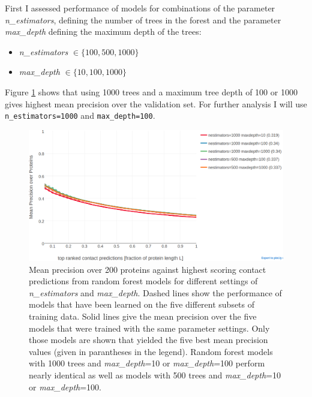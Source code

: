 \documentclass[12pt,a4paper,twoside]{book}
\providecommand{\tightlist}{%
  \setlength{\itemsep}{0pt}\setlength{\parskip}{0pt}}
\theoremstyle{definition}
\theoremstyle{definition}
\theoremstyle{remark}
\begin{document}
First I assessed performance of models for combinations of the parameter
\emph{n\_estimators}, defining the number of trees in the forest and the
parameter \emph{max\_depth} defining the maximum depth of the trees:

\begin{itemize}
\tightlist
\item
  \emph{n\_estimators} \(\in \{100,500,1000\}\)
\item
  \emph{max\_depth} \(\in \{10, 100, 1000\}\)
\end{itemize}

Figure \ref{fig:rf-gridsearch-nestimators-maxfeatures} shows that using
1000 trees and a maximum tree depth of 100 or 1000 gives highest mean
precision over the validation set. For further analysis I will use
\texttt{n\_estimators=1000} and \texttt{max\_depth=100}.













\begin{figure}

{\centering \includegraphics[width=0.9\linewidth]{img/random_forest_contact_prior/new_gridsearch/precision_vs_rank_cv_on_test_random_forest_nestimators1000_maxdepth1000_top5_notitle} 

}

\caption{Mean precision over
200 proteins against highest scoring contact predictions from random
forest models for different settings of \emph{n\_estimators} and
\emph{max\_depth}. Dashed lines show the performance of models that have
been learned on the five different subsets of training data. Solid lines
give the mean precision over the five models that were trained with the
same parameter settings. Only those models are shown that yielded the
five best mean precision values (given in parantheses in the legend).
Random forest models with 1000 trees and \emph{max\_depth}=10 or
\emph{max\_depth}=100 perform nearly identical as well as models with
500 trees and \emph{max\_depth}=10 or \emph{max\_depth}=100.}\label{fig:rf-gridsearch-nestimators-maxfeatures}
\end{figure}
\end{document}
